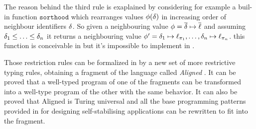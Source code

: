 The reason behind the third rule is exaplained by considering for example a buil-in function $\mathtt{sorthood}$ which rearranges values $\phi(\delta)$ in increasing order of neighbour identifiers $\delta$. So given a neighbouring value $\phi = \overline{\delta}\mapsto \overline{\ell}$ and assuming $\delta_1 \leq \ldots \leq \delta_n$ it returns a neighbouring value $\phi' = \delta_1\mapsto \ell_{\pi_1}, \ldots, \delta_n\mapsto \ell_{\pi_n}$. this function is conceivable in \HFC{} but it's impossible to implement in \FSCAFI{}.

Those restriction rules can be formalized in \FSCAFI{} by a new set of more restrictive typing rules, obtaining a fragment of the language called \textit{Aligned} \FSCAFI{}. It can be proved \cite{Scafi} that a well-typed program of one of the fragments can be transformed into a well-type program of the other with the same behavior. It can also be proved that Aligned \FSCAFI{} is Turing universal and all the base programming patterns provided in \cite{SelfStabilizing} for designing self-stabilising applications can be rewritten to fit into the fragment.
